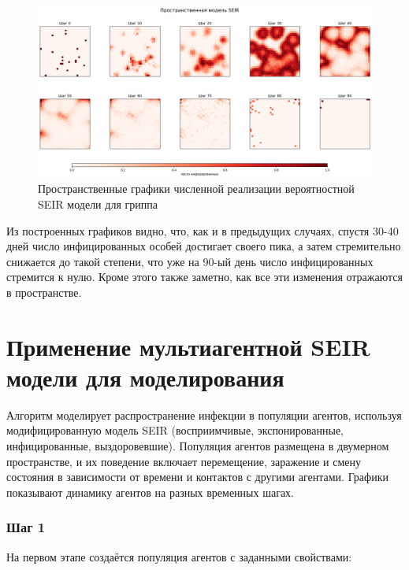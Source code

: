 \documentclass[a4paper, 14pt]{extreport}
\begin{document}
	\begin{figure}[h]
		\centering
		\includegraphics[scale=0.4]{images/graph03}
		\caption{Пространственные графики численной реализации вероятностной SEIR модели для гриппа}
		\label{fig:graph03}
	\end{figure}
	
	Из построенных графиков видно, что, как и в предыдущих случаях, спустя 30-40 дней число инфицированных особей достигает своего пика, а затем стремительно снижается до такой степени, что уже на 90-ый день число инфицированных стремится к нулю. Кроме этого также заметно, как все эти изменения отражаются в пространстве.
	
	\section{Применение мультиагентной SEIR модели для моделирования}
	Алгоритм моделирует распространение инфекции в популяции агентов, используя модифицированную модель SEIR (восприимчивые, экспонированные, инфицированные, выздоровевшие). Популяция агентов размещена в двумерном пространстве, и их поведение включает перемещение, заражение и смену состояния в зависимости от времени и контактов с другими агентами. Графики показывают динамику агентов на разных временных шагах.
	
	\subsubsection*{Шаг 1}
	
	На первом этапе создаётся популяция агентов с заданными свойствами:
	
\end{document}
